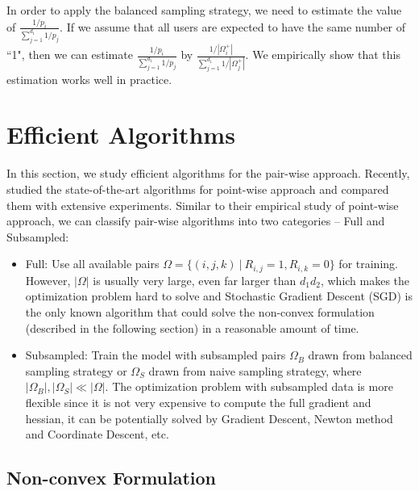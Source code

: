 \documentclass{article}
\numberwithin{equation}{section}
\newtheorem{sampling strategy}{Sampling Strategy}
\begin{document}
In order to apply the balanced sampling strategy, we need to estimate the value of $\frac{1/p_i}{\sum_{j=1}^{d_1} 1/p_j}$. If we assume that all users are expected to have the same number of ``1", then we can estimate $\frac{1/p_i}{\sum_{j=1}^{d_1} 1/p_j}$ by $\frac{1/|\Omega_i^+|}{\sum_{j=1}^{d_1} 1/|\Omega_j^+|}$. We empirically show that this estimation works well in practice.


\section{Efficient Algorithms}
\label{sec:algo}

In this section, we study efficient algorithms for the pair-wise approach. Recently, \cite{negsample} studied the state-of-the-art algorithms for point-wise approach and  compared them with extensive experiments. Similar to their empirical study of  point-wise approach, we can classify pair-wise algorithms into two  categories -- \textsf{Full} and \textsf{Subsampled}:

\begin{itemize}
    \item \textsf{Full}: Use all available pairs $\Omega = \{ (i,j,k) ~|~ R_{i,j} = 1, R_{i,k} = 0 \}$ for training. However, $|\Omega|$ is usually very large, even far larger than $d_1 d_2$, which makes the optimization problem hard to solve and Stochastic Gradient Descent (SGD) is the only known algorithm that could solve the non-convex formulation (described in the following section) in a reasonable amount of time.
    \item \textsf{Subsampled}: Train the model with subsampled pairs $\Omega_B$ drawn from balanced sampling strategy or $\Omega_S$ drawn from naive sampling strategy, where $|\Omega_B|, |\Omega_S| \ll |\Omega|$. The optimization problem with subsampled data is more flexible since it is not very expensive to compute the full gradient and hessian, it can be potentially solved by Gradient Descent, Newton method and Coordinate Descent, etc.
\end{itemize}

\subsection{Non-convex Formulation}
\end{document}
